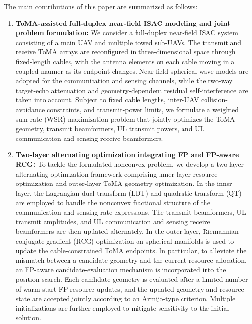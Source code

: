 \documentclass[letterpaper,journal]{IEEEtran}
\begin{document}
The main contributions of this paper are summarized as follows:
\begin{enumerate}
    \item \textbf{ToMA-assisted full-duplex near-field ISAC modeling and joint problem formulation:}
    We consider a full-duplex near-field ISAC system consisting of a main UAV and multiple towed sub-UAVs. The transmit and receive ToMA arrays are reconfigured in three-dimensional space through fixed-length cables, with the antenna elements on each cable moving in a coupled manner as its endpoint changes. Near-field spherical-wave models are adopted for the communication and sensing channels, while the two-way target-echo attenuation and geometry-dependent residual self-interference are taken into account. Subject to fixed cable lengths, inter-UAV collision-avoidance constraints, and transmit-power limits, we formulate a weighted sum-rate (WSR) maximization problem that jointly optimizes the ToMA geometry, transmit beamformers, UL transmit powers, and UL communication and sensing receive beamformers.

    \item \textbf{Two-layer alternating optimization integrating FP and FP-aware RCG:}
    To tackle the formulated nonconvex problem, we develop a two-layer alternating optimization framework comprising inner-layer resource optimization and outer-layer ToMA geometry optimization. In the inner layer, the Lagrangian dual transform (LDT) and quadratic transform (QT) are employed to handle the nonconvex fractional structure of the communication and sensing rate expressions. The transmit beamformers, UL transmit amplitudes, and UL communication and sensing receive beamformers are then updated alternately. In the outer layer, Riemannian conjugate gradient (RCG) optimization on spherical manifolds is used to update the cable-constrained ToMA endpoints. In particular, to alleviate the mismatch between a candidate geometry and the current resource allocation, an FP-aware candidate-evaluation mechanism is incorporated into the position search. Each candidate geometry is evaluated after a limited number of warm-start FP resource updates, and the updated geometry and resource state are accepted jointly according to an Armijo-type criterion. Multiple initializations are further employed to mitigate sensitivity to the initial solution.


\end{enumerate}
\end{document}
